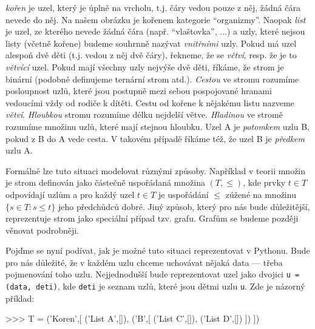 \begin{definition}
\emph{kořen} je uzel, který je úplně na vrcholu, t.j. čáry vedou pouze z něj, žádná čára nevede do něj. Na našem obrázku je kořenem kategorie ``organizmy''.
Naopak \emph{list} je uzel, ze kterého nevede žádná čára (např. ``vlaštovka'', ...) a uzly, které nejsou listy (včetně kořene) budeme souhrnně nazývat
\emph{vnitřními} uzly. Pokud má uzel alespoň dvě děti (t.j. vedou z něj dvě čáry), řekneme, že se \emph{větví}, resp. že je to \emph{větvící} uzel.
Pokud mají všechny uzly nejvýše dvě děti, říkáme, že strom je binární (podobně definujeme ternární strom atd.). \emph{Cestou} ve stromu rozumíme posloupnost uzlů, 
které jsou postupně mezi sebou pospojované hranami vedoucími vždy od rodiče k dítěti. Cestu od kořene k nějakému 
listu nazveme \emph{větví}. \emph{Hloubkou} stromu rozumíme délku nejdelší větve. \emph{Hladinou} ve stromě rozumíme množinu uzlů, které mají stejnou hloubku.
Uzel A je \emph{potomkem} uzlu B, pokud z B do A vede cesta. V takovém případě říkáme též, že uzel B je \emph{předkem} uzlu A. 
\end{definition}

\begin{note}\footnotesize
Formálně lze tuto situaci modelovat různými způsoby. Například v teorii množin je strom definován jako částečně uspořádaná množina $(T,\leq)$,
kde prvky $t\in T$ odpovídají uzlům a pro každý uzel $t\in T$ je uspořádání $\leq$ zúžené na množinu $\{s\in T:s\leq t\}$ jeho předchůdců dobré.
Jiný způsob, který pro nás bude důležitější, reprezentuje strom jako speciální případ tzv. grafu. Grafům se budeme později věnovat podrobněji.
\end{note}

Pojďme se nyní podívat, jak je možné tuto situaci reprezentovat v Pythonu. Bude pro nás důležité, že v každém uzlu
chceme uchovávat nějaká data --- třeba pojmenování toho uzlu. Nejjednodušší bude reprezentovat uzel jako dvojici  {\tt u = (data, deti)}, 
kde {\tt deti} je seznam uzlů, které jsou dětmi uzlu {\tt u}. Zde je názorný příklad:

\begin{center}
\begin{minipage}{8cm}
\begin{python}
>>> T = ('Koren',[
	          ('List A',[]),
		  ('B',[
			('List C',[]),
			('List D',[])
			])
		  ])
\end{python}
\end{minipage}
\begin{minipage}{5cm}
\end{minipage}
\end{center}

